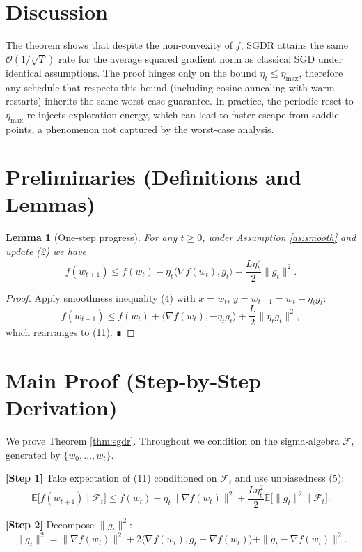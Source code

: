\documentclass{article}
\newtheorem{lemma}{Lemma}
\newcommand{\E}{\mathbb{E}}
\begin{document}
\section*{Discussion}
The theorem shows that despite the non‑convexity of $f$, SGDR attains the same $\mathcal{O}(1/\sqrt{T})$ rate for the average squared gradient norm as classical SGD under identical assumptions. The proof hinges only on the bound $\eta_t\le\eta_{\max}$, therefore any schedule that respects this bound (including cosine annealing with warm restarts) inherits the same worst‑case guarantee. In practice, the periodic reset to $\eta_{\max}$ re‑injects exploration energy, which can lead to faster escape from saddle points, a phenomenon not captured by the worst‑case analysis.

\section*{Preliminaries (Definitions and Lemmas)}
\begin{lemma}[One‑step progress]\label{lem:one-step}
For any $t\ge0$, under Assumption \ref{as:smooth} and update (2) we have
\[
f(w_{t+1}) \le f(w_t)-\eta_t\langle\nabla f(w_t),g_t\rangle
+\frac{L\eta_t^{2}}{2}\|g_t\|^{2}.
\tag{11}
\]
\end{lemma}
\begin{proof}
Apply smoothness inequality (4) with $x=w_t$, $y=w_{t+1}=w_t-\eta_t g_t$:
\[
f(w_{t+1})\le f(w_t)+\langle\nabla f(w_t),-\eta_t g_t\rangle
+\frac{L}{2}\|\eta_t g_t\|^{2},
\]
which rearranges to (11). ∎
\end{proof}

\section*{Main Proof (Step‑by‑Step Derivation)}
We prove Theorem \ref{thm:sgdr}. Throughout we condition on the sigma‑algebra $\mathcal{F}_t$ generated by $\{w_0,\dots,w_t\}$.

\medskip
\noindent\textbf{[Step 1]} Take expectation of (11) conditioned on $\mathcal{F}_t$ and use unbiasedness (5):
\[
\E\!\bigl[f(w_{t+1})\mid\mathcal{F}_t\bigr]
\le f(w_t)-\eta_t\|\nabla f(w_t)\|^{2}
+\frac{L\eta_t^{2}}{2}\E\!\bigl[\|g_t\|^{2}\mid\mathcal{F}_t\bigr].
\tag{12}
\]

\noindent\textbf{[Step 2]} Decompose $\|g_t\|^{2}$:
\[
\|g_t\|^{2}
=\|\nabla f(w_t)\|^{2}
+2\langle\nabla f(w_t),g_t-\nabla f(w_t)\rangle
+\|g_t-\nabla f(w_t)\|^{2}.
\tag{13}
\]
\end{document}
